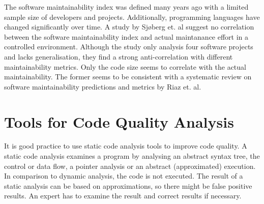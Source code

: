 The software maintainability index was defined many years ago with a limited sample size of developers and projects. Additionally, programming languages have changed significantly over time. A study by Sjøberg et. al suggest no correlation between the software maintainability index and actual maintanance effort in a controlled environment\cite{sjoberg_questioning_nodate}. Although the study only analysis four software projects and lacks generalisation, they find a strong anti-correlation with different maintainability metrics. Only the code size seems to correlate with the actual maintainability. The former seems to be consistent with a systematic review on software maintainability predictions and metrics by Riaz et. al\cite{riaz_systematic_2009}.


\section{Tools for Code Quality Analysis}\label{sec:tool_comparison}
It is good practice to use static code analysis tools to improve code quality. A static code analysis examines a program by analysing an abstract syntax tree, the control or data flow, a pointer analysis or an abstract (approximated) execution. In comparison to dynamic analysis, the code is not executed. The result of a static analysis can be based on approximations, so there might be false positive results. An expert has to examine the result and correct results if necessary\cite{prahofer_static_2017}.

